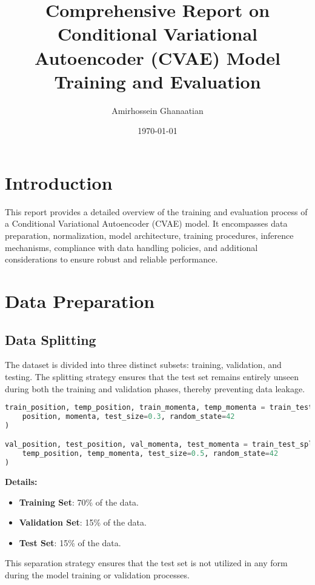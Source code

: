 \documentclass[10pt]{article}
\title{Comprehensive Report on Conditional Variational Autoencoder (CVAE) Model Training and Evaluation}
\author{Amirhossein Ghanaatian}
\date{\today}
\begin{document}
\maketitle

\tableofcontents

\newpage

\section{Introduction}
This report provides a detailed overview of the training and evaluation process of a Conditional Variational Autoencoder (CVAE) model. It encompasses data preparation, normalization, model architecture, training procedures, inference mechanisms, compliance with data handling policies, and additional considerations to ensure robust and reliable performance.

\section{Data Preparation}

\subsection{Data Splitting}
The dataset is divided into three distinct subsets: training, validation, and testing. The splitting strategy ensures that the test set remains entirely unseen during both the training and validation phases, thereby preventing data leakage.

\begin{lstlisting}[language=Python, caption=Data Splitting Procedure]
train_position, temp_position, train_momenta, temp_momenta = train_test_split(
    position, momenta, test_size=0.3, random_state=42
)

val_position, test_position, val_momenta, test_momenta = train_test_split(
    temp_position, temp_momenta, test_size=0.5, random_state=42
)
\end{lstlisting}

\textbf{Details:}
\begin{itemize}
    \item \textbf{Training Set}: 70\% of the data.
    \item \textbf{Validation Set}: 15\% of the data.
    \item \textbf{Test Set}: 15\% of the data.
\end{itemize}

This separation strategy ensures that the test set is not utilized in any form during the model training or validation processes.
\end{document}

